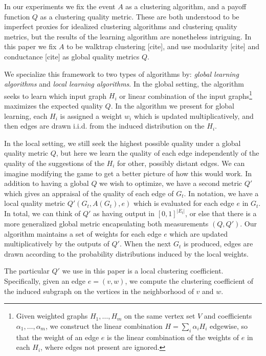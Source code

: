 \documentclass{article}[11pt]
\begin{document}
In our experiments we fix the event $A$ as a clustering algorithm, and a payoff
function $Q$ as a clustering quality metric. These are both understood to be
imperfect proxies for idealized clustering algorithms and clustering quality
metrics, but the results of the learning algorithm are nonetheless intriguing.
In this paper we fix $A$ to be walktrap clustering [cite], and use modularity
[cite] and conductance [cite] as global quality metrics $Q$.

We specialize this framework to two types of algorithms by: \textit{global
learning algorithms} and \textit{local learning algorithms}. In the global
setting, the algorithm seeks to learn which input graph $H_i$ or linear
combination of the input graphs\footnote{Given weighted graphs $H_1, \dots,
H_m$ on the same vertex set $V$ and coefficients $\alpha_1, \dots, \alpha_m$,
we construct the linear combination $H = \sum_i \alpha_i H_i$ edgewise, so that
the weight of an edge $e$ is the linear combination of the weights of $e$ in
each $H_i$, where edges not present are ignored.} maximizes the expected
quality $Q$. In the algorithm we present for global learning, each $H_i$ is
assigned a weight $w_i$ which is updated multiplicatively, and then edges are
drawn i.i.d. from the induced distribution on the $H_i$.  

In the local setting, we still seek the highest possible quality under a global
quality metric $Q$, but here we learn the quality of each edge independently of
the quality of the suggestions of the $H_i$ for other, possibly distant edges.
We can imagine modifying the game to get a better picture of how this would
work. In addition to having a global $Q$ we wish to optimize, we have a second
metric $Q'$ which gives an appraisal of the quality of each edge of $G_t$. In
notation, we have a local quality metric $Q'(G_t, A(G_t), e)$ which is
evaluated for each edge $e$ in $G_t$. In total, we can think of $Q'$ as having
output in $[0,1]^{|E_t|}$, or else that there is a more generalized global
metric encapsulating both measurements $(Q, Q')$. Our algorithm maintains a set
of weights for each edge $e$ which are updated multiplicatively by the outputs
of $Q'$. When the next $G_t$ is produced, edges are drawn according to the
probability distributions induced by the local weights.

The particular $Q'$ we use in this paper is a local clustering coefficient.
Specifically, given an edge $e = (v,w)$, we compute the clustering coefficient
of the induced subgraph on the vertices in the neighborhood of $v$ and $w$. 
\end{document}
